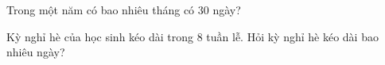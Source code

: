 \begin{ex} %
Trong một năm có bao nhiêu tháng có 30 ngày?
\end{ex}

\begin{ex} %
Kỳ nghỉ hè của học sinh kéo dài trong 8 tuần lễ. Hỏi kỳ nghỉ hè kéo dài bao nhiêu ngày?
\end{ex}

